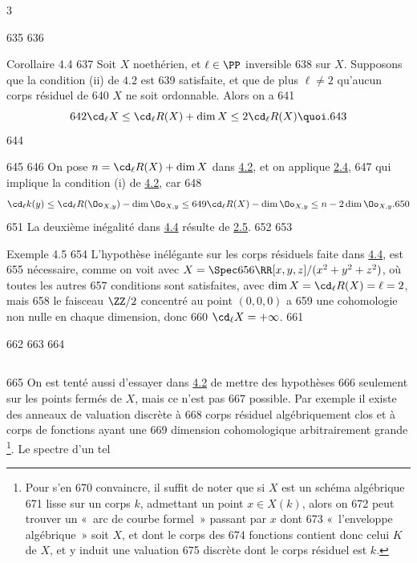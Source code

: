 3	\documentclass[10pt]{../fichiers-configuration-latex/smfart}
\begin{document}
   635	
   636	\begin{enonce*}{Corollaire 4.4}
   637	Soit $X$ noethérien, et $\ell\in \PP$ inversible
   638	sur $X$. Supposons que la condition {\rm (ii)} de $4.2$ est
   639	satisfaite, et que de plus $\ell\neq 2$  qu'aucun corps résiduel de
   640	$X$ ne soit ordonnable. Alors on a
   641	$$
   642	\cd_{\ell}X\leq \cd_{\ell}R(X)+\dim X\leq 2\cd_{\ell}R(X){\quoi}.
   643	$$
   644	\end{enonce*}
   645	
   646	On pose $n=\cd_{\ell}R(X)+\dim X$ dans \hyperref[X.cor4.2]{4.2}, et on applique \hyperref[X.cor2.4]{2.4}, 
   647	qui implique la condition (i) de \hyperref[X.cor4.2]{4.2}, car
   648	\[\cd_{\ell}k(y)\leq \cd_{\ell}R(\Oo_{X,y})-\dim \Oo_{X,y}\leq
   649	\cd_{\ell}R(X)-\dim\Oo_{X,y}\leq n-2\dim \Oo_{X,y}.
   650	\]
   651	La deuxième inégalité dans \hyperref[X.cor4.4]{4.4} résulte de \hyperref[X.cor2.5]{2.5}.
   652	
   653	\begin{enonce*}[remark]{Exemple 4.5}
   654	L'hypothèse inélégante sur les corps résiduels faite dans \hyperref[X.cor4.4]{4.4}, est
   655	nécessaire, comme on voit avec $X=\Spec
   656	\RR[x,y,z]/(x^2+y^2+z^2)$, où toutes les autres
   657	conditions sont satisfaites, avec $\dim X=\cd_{\ell}R(X)=\ell=2$, mais
   658	le faisceau $\ZZ/2$ concentré au point $(0,0,0)$ a
   659	une cohomologie non nulle en chaque dimension, donc
   660	$\cd_{\ell}X=+\infty$.
   661	\end{enonce*}
   662	
   663	\setcounter{subsection}{5}
   664	\subsection{}
   665	On est tenté aussi d'essayer dans \hyperref[X.cor4.2]{4.2} de mettre des hypothèses
   666	seulement sur les points fermés de $X$, mais ce n'est pas
   667	possible. Par exemple il existe des anneaux de valuation discrète à
   668	corps résiduel algébriquement clos et à corps de fonctions ayant une
   669	dimension cohomologique arbitrairement grande \footnote[1]{Pour s'en
   670	  convaincre, il suffit de noter que si $X$ est un schéma algébrique
   671	  lisse sur un corps $k$, admettant un point $x\in X(k)$, alors on
   672	  peut trouver un « arc de courbe formel » passant par $x$ dont
   673	  « l'enveloppe algébrique » soit $X$, et dont le corps des
   674	  fonctions contient donc celui $K$ de $X$, et y induit une valuation
   675	  discrète dont le corps résiduel est $k$.}. Le spectre d'un tel
\end{document}

